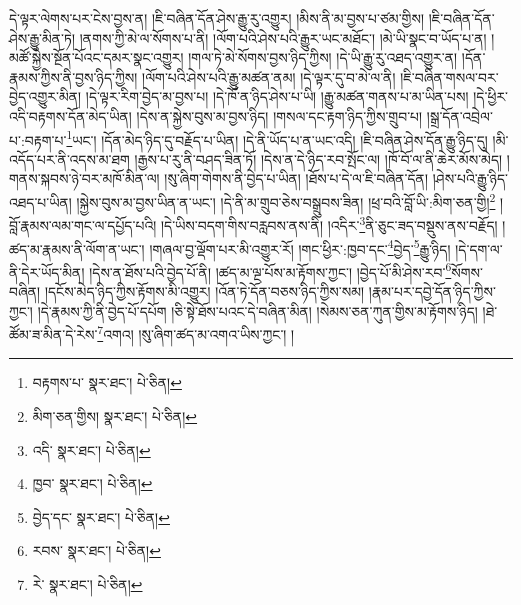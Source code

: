 དེ་ལྟར་ལེགས་པར་ངེས་བྱས་ན། །ཇི་བཞིན་དོན་ཤེས་རྒྱུ་རུ་འགྱུར། །མིས་ནི་མ་བྱས་པ་ཙམ་གྱིས། །ཇི་བཞིན་དོན་ཤེས་རྒྱུ་མིན་ཏེ། །ནགས་ཀྱི་མེ་ལ་སོགས་པ་ནི། །ལོག་པའི་ཤེས་པའི་རྒྱུར་ཡང་མཐོང་། །མེ་ཡི་སྣང་བ་ཡོད་པ་ན། །མཚོ་སྐྱེས་སྔོན་པོའང་དམར་སྣང་འགྱུར། །གལ་ཏེ་མེ་སོགས་བྱས་ཉིད་ཀྱིས། །དེ་ཡི་རྒྱུ་རུ་འཐད་འགྱུར་ན། །དོན་རྣམས་ཀྱིས་ནི་བྱས་ཉིད་ཀྱིས། །ལོག་པའི་ཤེས་པའི་རྒྱུ་མཚན་ནམ། །དེ་ལྟར་དུ་བ་མེ་ལ་ནི། །ཇི་བཞིན་གསལ་བར་བྱེད་འགྱུར་མིན། །དེ་ལྟར་རིག་བྱེད་མ་བྱས་པ། །དེ་ཁོ་ན་ཉིད་ཤེས་པ་ཡི། །རྒྱུ་མཚན་གནས་པ་མ་ཡིན་པས། །དེ་ཕྱིར་འདི་བརྟགས་དོན་མེད་ཡིན། །དེས་ན་སྐྱེས་བུས་མ་བྱས་ཉིད། །གསལ་དང་རྟག་ཉིད་ཀྱིས་གྲུབ་པ། །སྒྲ་དོན་འབྲེལ་པ་:བརྟག་པ་\footnote{བརྟགས་པ་  སྣར་ཐང་།  པེ་ཅིན། }ཡང་། །དོན་མེད་ཉིད་དུ་བརྗོད་པ་ཡིན། །དེ་ནི་ཡོད་པ་ན་ཡང་འདི། །ཇི་བཞིན་ཤེས་དོན་རྒྱུ་ཉིད་དུ། །མི་འདོད་པར་ནི་འདས་མ་ཐག །རྒྱས་པ་རུ་ནི་བཤད་ཟིན་ཏོ། །དེས་ན་དེ་ཉིད་རབ་སྤོང་ལ། །ཁོ་བོ་ལ་ནི་ཆེར་མོས་མེད། །གནས་སྐབས་ཉེ་བར་མཁོ་མིན་ལ། །སུ་ཞིག་གེགས་ནི་བྱེད་པ་ཡིན། །ཐོས་པ་དེ་ལ་ཇི་བཞིན་དོན། །ཤེས་པའི་རྒྱུ་ཉིད་འཐད་པ་ཡིན། །སྐྱེས་བུས་མ་བྱས་ཡིན་ན་ཡང་། །དེ་ནི་མ་གྲུབ་ཅེས་བསྒྲུབས་ཟིན། །ཕྲ་བའི་བློ་ཡི་:མིག་ཅན་གྱི།\footnote{མིག་ཅན་གྱིས།  སྣར་ཐང་།  པེ་ཅིན། } །བློ་རྣམས་ལམ་གང་ལ་དཔྱོད་པའི། །དེ་ཡིས་བདག་གིས་བརླབས་ནས་ནི། །འདིར་\footnote{འདི་  སྣར་ཐང་།  པེ་ཅིན། }ནི་ཅུང་ཟད་བསྡུས་ནས་བརྗོད། །ཚད་མ་རྣམས་ནི་ལོག་ན་ཡང་། །གཞལ་བྱ་ལྡོག་པར་མི་འགྱུར་རོ། །གང་ཕྱིར་:ཁྱབ་དང་\footnote{ཁྱབ་  སྣར་ཐང་།  པེ་ཅིན། }བྱེད་\footnote{བྱེད་དང་  སྣར་ཐང་།  པེ་ཅིན། }རྒྱུ་ཉིད། །དེ་དག་ལ་ནི་དེར་ཡོད་མིན། །དེས་ན་ཐོས་པའི་བྱེད་པོ་ནི། །ཚད་མ་ལྔ་པོས་མ་རྟོགས་ཀྱང་། །བྱེད་པོ་མི་ཤེས་རབ་\footnote{རབས་  སྣར་ཐང་།  པེ་ཅིན། }སོགས་བཞིན། །དངོས་མེད་ཉིད་ཀྱིས་རྟོགས་མི་འགྱུར། །འོན་ཏེ་དོན་བཅས་ཉིད་ཀྱིས་སམ། །རྣམ་པར་དབྱེ་དོན་ཉིད་ཀྱིས་ཀྱང་། །དེ་རྣམས་ཀྱི་ནི་བྱེད་པོ་དཔོག །ཅི་སྟེ་ཐོས་པའང་དེ་བཞིན་མིན། །སེམས་ཅན་ཀུན་གྱིས་མ་རྟོགས་ཉིད། །ཐེ་ཚོམ་ཟ་མིན་དེ་རེས་\footnote{རེ་  སྣར་ཐང་།  པེ་ཅིན། }འགའ། །སུ་ཞིག་ཚད་མ་འགའ་ཡིས་ཀྱང་། །
